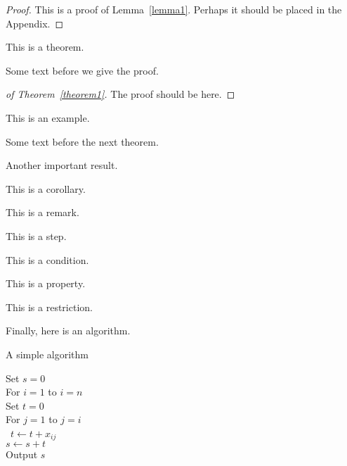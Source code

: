 \documentclass[article,lineno]{biometrika}
\begin{document}
\begin{proof}
This is a proof of Lemma~\ref{lemma1}.  Perhaps it should be placed in the Appendix.
\end{proof}

\begin{theorem}
\label{theorem1}
This is a theorem.
\end{theorem}

Some text before we give the proof.

\begin{proof}[of Theorem~\ref{theorem1}]
The proof should be here.
\end{proof}

\begin{example}
This is an example.
\end{example}

Some text before the next theorem.

\begin{theorem}
Another important result.
\end{theorem}

\begin{corollary}
This is a corollary.
\end{corollary}

\begin{remark}
This is a remark.
\end{remark}

\begin{step}
This is a step.
\end{step}

\begin{condition}
This is a condition.
\end{condition}


\begin{property}
This is a property.
\end{property}

\begin{restriction}
This is a restriction.
\end{restriction}

\begin{algo}
Finally, here is an algorithm.
\end{algo}


\begin{algorithm}[!h]
\vspace*{-6pt}
\caption{A simple algorithm} \label{al1}
\vspace*{-12pt}
\begin{tabbing}
   \enspace Set $s=0$\\
   \enspace For $i=1$ to $i=n$ \\
   \qquad Set $t=0$\\
   \qquad For $j=1$ to $j=i$ \\\
  \qquad\qquad  $t \leftarrow t + x_{ij}$ \\
\qquad $s \leftarrow s + t$ \\
\enspace Output $s$
\end{tabbing}
\vspace*{-6pt}
\end{algorithm}
\end{document}

